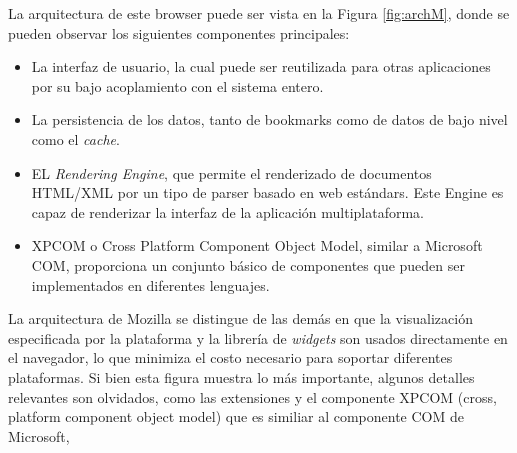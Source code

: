         La arquitectura de este browser puede ser vista en la Figura \ref{fig:archM}, donde se pueden observar los siguientes componentes principales:
                \begin{itemize}
                    \item La interfaz de usuario, la cual puede ser reutilizada para otras aplicaciones por su bajo acoplamiento con el sistema entero. 
                    \item La persistencia de los datos, tanto de bookmarks como de datos de bajo nivel como el \textit{cache}.
                    \item EL \textit{Rendering Engine}, que permite el renderizado de documentos HTML/XML por un tipo de parser basado en web estándars. Este Engine es capaz de renderizar la interfaz de la aplicación multiplataforma.
                    \item XPCOM o Cross Platform Component Object Model, similar a Microsoft COM, proporciona un conjunto básico de componentes que pueden ser implementados en diferentes lenguajes.
                \end{itemize}
        La arquitectura de Mozilla se distingue de las demás en que la visualización especificada por la plataforma y la librería de \textit{widgets} son usados directamente en el navegador, lo que minimiza el costo necesario para soportar diferentes plataformas. Si bien esta figura muestra lo más importante, algunos detalles relevantes son olvidados, como las extensiones y el componente XPCOM (cross, platform component object model) que es similiar al componente COM de Microsoft,

